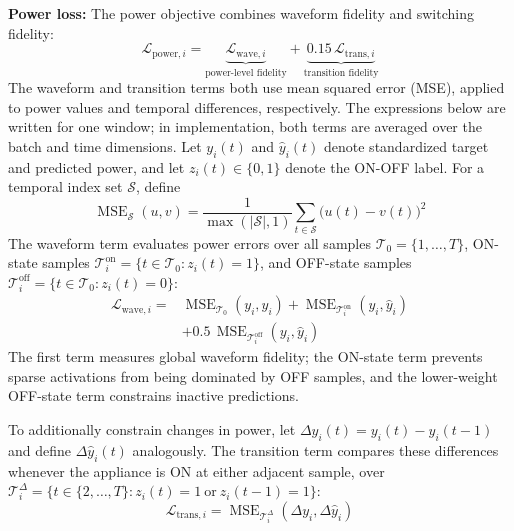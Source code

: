 \documentclass[journal]{IEEEtran}
\begin{document}
\textbf{Power loss:}
The power objective combines waveform fidelity and switching fidelity:
\begin{equation}
\mathcal{L}_{\mathrm{power},i}=
\underbrace{\mathcal{L}_{\mathrm{wave},i}}_{\text{power-level fidelity}}
+\underbrace{0.15\,\mathcal{L}_{\mathrm{trans},i}}_{\text{transition fidelity}}
\label{eq:power-loss}
\end{equation}
The waveform and transition terms both use mean squared error (MSE), applied to power values and temporal differences, respectively. The expressions below are written for one window; in implementation, both terms are averaged over the batch and time dimensions. Let $y_i(t)$ and $\hat y_i(t)$ denote standardized target and predicted power, and let $z_i(t)\in\{0,1\}$ denote the ON-OFF label. For a temporal index set $\mathcal{S}$, define
\begin{equation}
\operatorname{MSE}_{\mathcal{S}}(u,v)=
\frac{1}{\max(|\mathcal{S}|,1)}
\sum_{t\in\mathcal{S}}\bigl(u(t)-v(t)\bigr)^2
\label{eq:temporal-mse}
\end{equation}
The waveform term evaluates power errors over all samples $\mathcal{T}_0=\{1,\ldots,T\}$, ON-state samples $\mathcal{T}^{\mathrm{on}}_i=\{t\in\mathcal{T}_0:z_i(t)=1\}$, and OFF-state samples $\mathcal{T}^{\mathrm{off}}_i=\{t\in\mathcal{T}_0:z_i(t)=0\}$:
\begin{equation}
\begin{aligned}
\mathcal{L}_{\mathrm{wave},i}={}&
\operatorname{MSE}_{\mathcal{T}_0}(y_i,\hat y_i)
+\operatorname{MSE}_{\mathcal{T}^{\mathrm{on}}_i}(y_i,\hat y_i)\\
&+0.5\,\operatorname{MSE}_{\mathcal{T}^{\mathrm{off}}_i}(y_i,\hat y_i)
\end{aligned}
\label{eq:waveform-loss}
\end{equation}
The first term measures global waveform fidelity; the ON-state term prevents sparse activations from being dominated by OFF samples, and the lower-weight OFF-state term constrains inactive predictions.

To additionally constrain changes in power, let $\Delta y_i(t)=y_i(t)-y_i(t-1)$ and define $\Delta\hat y_i(t)$ analogously. The transition term compares these differences whenever the appliance is ON at either adjacent sample, over $\mathcal{T}^{\Delta}_i=\{t\in\{2,\ldots,T\}:z_i(t)=1\ \text{or}\ z_i(t-1)=1\}$:
\begin{equation}
\mathcal{L}_{\mathrm{trans},i}=
\operatorname{MSE}_{\mathcal{T}^{\Delta}_i}(\Delta y_i,\Delta\hat y_i)
\label{eq:transition-loss}
\end{equation}
\end{document}
